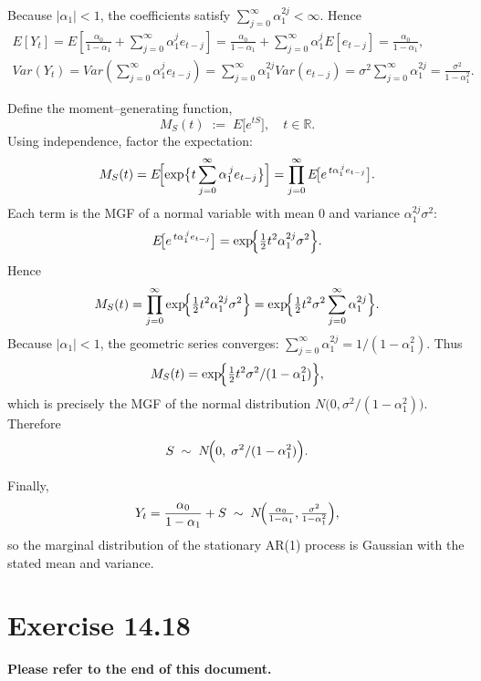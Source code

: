 \documentclass{article}
\begin{document}
    Because \(|\alpha_1|<1\), the coefficients satisfy \(\sum_{j=0}^\infty \alpha_1^{2j}<\infty\). Hence
    \begin{align*}
        E[Y_t]
        =E\left[\frac{\alpha_0}{1-\alpha_1} + \sum_{j=0}^\infty \alpha_1^j e_{t-j}\right]
        =\frac{\alpha_0}{1-\alpha_1} + \sum_{j=0}^\infty \alpha_1^j E[e_{t-j}]
        =\frac{\alpha_0}{1-\alpha_1},\\
        Var(Y_t) = Var\left(\sum_{j=0}^\infty \alpha_1^j e_{t-j}\right)=\sum_{j=0}^\infty \alpha_1^{2j} Var(e_{t-j})=\sigma^2 \sum_{j=0}^\infty \alpha_1^{2j}=\frac{\sigma^2}{1-\alpha_1^2}.
    \end{align*}

    Define the moment--generating function,
    \[
        M_S(t) \;:=\; E\!\bigl[e^{tS}\bigr],
        \quad t\in \mathbb{R}.
    \]
    Using independence, factor the expectation:
    \[
    \begin{aligned}
        M_S(t)
        = E\!\Bigl[\exp\bigl\{t\sum_{j=0}^{\infty}\alpha_1^{\,j}e_{t-j}\bigr\}\Bigr]
        = \prod_{j=0}^{\infty} E\!\bigl[e^{\,t\alpha_1^{\,j}e_{t-j}}\bigr].
    \end{aligned}
    \]
    Each term is the MGF of a normal variable with mean \(0\) and variance
    \(\alpha_1^{2j}\sigma^{2}\):
    \[
        E\!\bigl[e^{\,t\alpha_1^{\,j}e_{t-j}}\bigr]
        = \exp\!\Bigl\{\tfrac12 t^{2}\alpha_1^{2j}\sigma^{2}\Bigr\}.
    \]
    Hence
    \[
        M_S(t)
        = \prod_{j=0}^{\infty}
          \exp\!\Bigl\{\tfrac12 t^{2}\alpha_1^{2j}\sigma^{2}\Bigr\}
        = \exp\!\Bigl\{\tfrac12 t^{2}\sigma^{2}
            \sum_{j=0}^{\infty}\alpha_1^{2j}\Bigr\}.
    \]
    Because \(|\alpha_1|<1\), the geometric series converges:
    \(
        \sum_{j=0}^{\infty}\alpha_1^{2j} = 1/(1-\alpha_1^{2}).
    \)
    Thus
    \[
        M_S(t)
        = \exp\!\Bigl\{\tfrac12 t^{2}\sigma^{2}/(1-\alpha_1^{2})\Bigr\},
    \]
    which is precisely the MGF of the normal distribution
    \(N\!\bigl(0,\sigma^{2}/(1-\alpha_1^{2})\bigr)\).
    Therefore
    \[
        S \;\sim\; N\!\Bigl(0,\;\sigma^{2}/(1-\alpha_1^{2})\Bigr).
    \]
    
    Finally,
    \[
        Y_t
        = \frac{\alpha_0}{1-\alpha_1} + S
        \;\sim\;
        N\!\Bigl(
            \tfrac{\alpha_0}{1-\alpha_1},
            \tfrac{\sigma^{2}}{1-\alpha_1^{2}}
          \Bigr),
    \]
    so the marginal distribution of the stationary AR(1) process is Gaussian
    with the stated mean and variance.

\section{Exercise 14.18}
\textbf{Please refer to the end of this document.}
\end{document}
